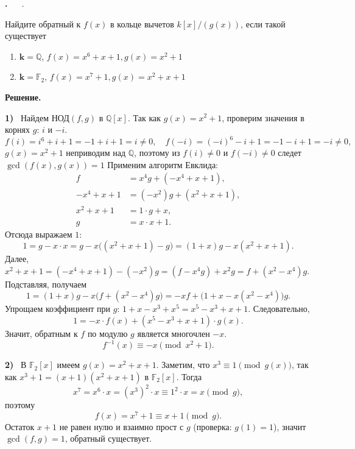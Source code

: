 \documentclass[12pt,a4paper]{article}
\date{}                             %
\newcounter{task}                   %
\newenvironment{task}[1][]{%
  \refstepcounter{task}%
  \par\vspace{0.3\baselineskip}%
  \noindent\textbf{\thetask.}%
  \if\relax\detokenize{#1}\relax   %
    \ \ignorespaces                 %
  \else
    \ \textbf{#1}.\ \ignorespaces   %
  \fi
}{%
  \par\vspace{0.2\baselineskip}%
}
\newcommand{\sol}{%
  \par\vspace{0.3\baselineskip}%
  \noindent\textbf{Решение.}\ %
  \ignorespaces                     %
}
\newcommand{\soli}[1]{%
  \par\vspace{0.15\baselineskip}%
  \noindent\textbf{#1)}\ %
  \ignorespaces                     %
}
\newcommand{\sheetnumber}[1]{\def\sheetnumber{#1}}
\newcommand{\studentname}[1]{\def\studentname{#1}}
\newcommand{\assignmenttitle}[1]{\def\assignmenttitle{#1}}
\begin{document}
\sheetnumber{2}                     %
\studentname{Амехин Илья}           %
\assignmenttitle{Многочлены и конечные поля} %
\maketitle


\begin{task}
    Найдите обратный к $f(x)$ в кольце вычетов $k[x]/(g(x))$, если такой существует
    \begin{enumerate}
	\item $\textbf{k} = \mathbb{Q}$, $f(x) = x^6 + x + 1, g(x) = x^2 + 1$
	\item $\textbf{k} = \mathbb{F}_2$, $f(x) = x^7 + 1, g(x) = x^2 + x + 1$
    \end{enumerate}
\end{task}

\sol
\soli{1} Найдем НОД$(f,g)$ в $\mathbb{Q}[x]$. Так как $g(x)=x^2+1$, проверим значения в корнях $g$: $i$ и $-i$. 
\[
f(i)=i^6+i+1=-1+i+1=i\neq 0,\quad f(-i)=(-i)^6-i+1=-1-i+1=-i\neq 0,
\]
$g(x) = x^2 + 1$ неприводим над $\mathbb{Q}$, поэтому из $f(i) \neq 0$ и $f(-i) \neq 0$ следет $\gcd(f(x),g(x)) = 1$
Применим алгоритм Евклида:
\[
\begin{aligned}
f &= x^4 g + (-x^4+x+1),\\
-x^4+x+1 &= (-x^2)g + (x^2+x+1),\\
x^2+x+1 &= 1\cdot g + x,\\
g &= x\cdot x + 1.
\end{aligned}
\]
Отсюда выражаем $1$:
\[
1 = g - x\cdot x = g - x\big((x^2+x+1)-g\big) = (1+x)g - x(x^2+x+1).
\]
Далее, $x^2+x+1 = (-x^4+x+1) - (-x^2)g = (f - x^4 g) + x^2 g = f + (x^2 - x^4)g$. Подставляя, получаем
\[
1 = (1+x)g - x\big(f + (x^2 - x^4)g\big) = -x f + \big(1+x - x(x^2 - x^4)\big)g.
\]
Упрощаем коэффициент при $g$: $1+x - x^3 + x^5 = x^5 - x^3 + x + 1$. Следовательно,
\[
1 = -x\cdot f(x) + (x^5 - x^3 + x + 1)\cdot g(x).
\]
Значит, обратным к $f$ по модулю $g$ является многочлен $-x$. 
\[
\boxed{f^{-1}(x) \equiv -x \pmod{x^2+1}}.
\]

\soli{2} В $\mathbb{F}_2[x]$ имеем $g(x)=x^2+x+1$. Заметим, что $x^3 \equiv 1 \pmod{g(x)}$, так как $x^3+1 = (x+1)(x^2+x+1)$ в $\mathbb{F}_2[x]$. Тогда
\[
x^7 = x^{6}\cdot x = (x^3)^2 \cdot x \equiv 1^2 \cdot x = x \pmod{g},
\]
поэтому
\[
f(x)=x^7+1 \equiv x+1 \pmod{g}.
\]
Остаток $x+1$ не равен нулю и взаимно прост с $g$ (проверка: $g(1)=1$), значит $\gcd(f,g)=1$, обратный существует.
\end{document}
